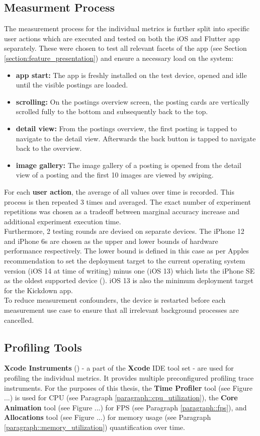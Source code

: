 \subsection{Measurment Process} \label{subsection::measurement_process}
The measurement process for the individual metrics is further split into specific user actions
which are executed and tested on both the iOS and Flutter app separately. These were chosen
to test all relevant facets of the app (see Section \ref{section:feature_presentation}) and ensure a necessary load on the system:
\begin{itemize}
    \item \textbf{app start:} The app is freshly installed on the test device, opened and idle until the visible postings are loaded.
    \item \textbf{scrolling:} On the postings overview screen, the posting cards are vertically scrolled fully to the bottom and subsequently back to the top.
    \item \textbf{detail view:} From the postings overview, the first posting is tapped to navigate to the detail view. Afterwards the back button is tapped to navigate back to the overview.
    \item \textbf{image gallery:} The image gallery of a posting is opened from the detail view of a posting and the first 10 images are viewed by swiping.
\end{itemize}
For each \textbf{user action}, the average of all values over time is recorded. This process is then
repeated 3 times and averaged. The exact number of experiment repetitions was chosen as a
tradeoff between marginal accuracy increase and additional experiment execution time.\\
Furthermore, 2 testing rounds are devised on separate devices. The iPhone 12 and iPhone
6s are chosen as the upper and lower bounds of hardware performance respectively. The lower
bound is defined in this case as per Apples recommendation to set the deployment target to the
current operating system version (iOS 14 at time of writing) minus one (iOS 13) which lists the
iPhone SE as the oldest supported device (\cite{Apple2021}). iOS 13 is also the minimum deployment target for the Kickdown app.\\
To reduce measurement confounders, the device is restarted before each measurement use case to ensure that all
irrelevant background processes are cancelled.

\subsection{Profiling Tools} \label{subsection::profiling_tooling}
\textbf{Xcode Instruments} (\cite{Apple2019}) - a part of the \textbf{Xcode} IDE tool set - are used for profiling the individual metrics. It provides multiple preconfigured
profiling trace instruments.
For the purposes of this thesis, the \textbf{Time Profiler} tool (see Figure ...) is used for CPU (see Paragraph \ref{paragraph::cpu_utilization}), the \textbf{Core Animation} tool (see Figure ...) for FPS (see Paragraph \ref{paragraph::fps}), and 
\textbf{Allocations} tool (see Figure ...) for memory usage (see Paragraph \ref{paragraph::memory_utilization}) quantification over time.


